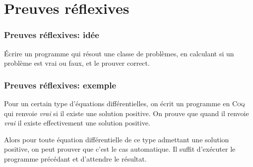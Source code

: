 \documentclass[hyperref={pdfpagelabels=false}]{beamer}
\begin{document}
\section{Preuves réflexives}
\begin{frame}
  \frametitle{Preuves réflexives: idée}
    Écrire un programme qui résout une classe de problèmes, en calculant si un problème est vrai ou faux, et le prouver correct.
\end{frame}
\begin{frame}
  \frametitle{Preuves réflexives: exemple}
  Pour un certain type d'équations différentielles, on écrit un programme en \textsc{Coq} qui renvoie \emph{vrai} si il existe une solution positive. On prouve que quand il renvoie \emph{vrai} il existe effectivement une solution positive.

  Alors pour toute équation différentielle de ce type admettant une solution positive, on peut prouver que c'est le cas automatique. Il suffit d'exécuter le programme précédant et d'attendre le résultat.
\end{frame}
\end{document}
